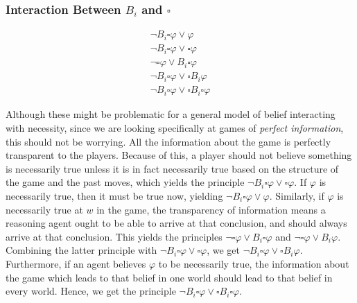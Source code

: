 \documentclass{article}
\begin{document}
\subsubsection{Interaction Between $B_i$ and $\square$}
\begin{gather*}
    \lnot B_i\square\varphi\lor\varphi\\
    \lnot B_i\square\varphi\lor\square\varphi\\
    \lnot\square\varphi\lor B_i\square\varphi\\
    \lnot B_i\square\varphi\lor\square B_i\varphi\\
    \lnot B_i\square\varphi\lor\square B_i\square\varphi
\end{gather*}

Although these might be problematic for a general model of belief interacting with necessity, since we are looking specifically at games of \textit{perfect information}, this should not be worrying. All the information about the game is perfectly transparent to the players. Because of this, a player should not believe something is necessarily true unless it is in fact necessarily true based on the structure of the game and the past moves, which yields the principle $\lnot B_i\square\varphi\lor\square\varphi$. If $\varphi$ is necessarily true, then it must be true now, yielding $\lnot B_i\square\varphi\lor\varphi$. Similarly, if $\varphi$ is necessarily true at $w$ in the game, the transparency of information means a reasoning agent ought to be able to arrive at that conclusion, and should always arrive at that conclusion. This yields the principles $\lnot\square\varphi\lor B_i\square\varphi$ and $\lnot\square\varphi\lor B_i\varphi$. Combining the latter principle with $\lnot B_i\square\varphi\lor\square\varphi$, we get $\lnot B_i\square\varphi\lor\square B_i\varphi$. Furthermore, if an agent believes $\varphi$ to be necessarily true, the information about the game which leads to that belief in one world should lead to that belief in every world. Hence, we get the principle $\lnot B_i\square\varphi\lor\square B_i\square\varphi$.
\end{document}
